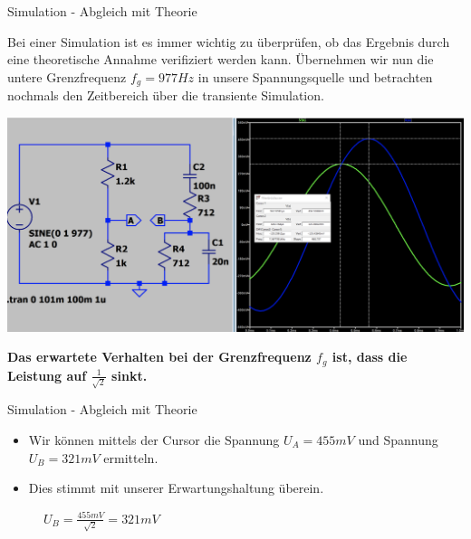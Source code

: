 \begin{frame}[t]{Simulation - Abgleich mit Theorie}

  Bei einer Simulation ist es immer wichtig zu überprüfen, ob das Ergebnis durch eine theoretische Annahme verifiziert werden kann.
  Übernehmen wir nun die untere Grenzfrequenz $f_g=977Hz$ in unsere Spannungsquelle und betrachten nochmals den Zeitbereich über die transiente Simulation.

  \begin{spacing}{0.9} \begin{tiny}
      \begin{minipage}{\textwidth}
        \includegraphics[width=0.75\linewidth]{pictures/wheatstone_transientent_fg.png}
      \end{minipage}
    \end{tiny} \end{spacing}

  \textbf{Das erwartete Verhalten bei der Grenzfrequenz $f_g$ ist, dass die Leistung auf $\frac{1}{\sqrt{2}}$ sinkt.}
\end{frame}

\begin{frame}[t]{Simulation - Abgleich mit Theorie}

  \begin{itemize}
    \item Wir können mittels der Cursor die Spannung $U_A=455mV$ und Spannung $U_B=321mV$ ermitteln.
    \item Dies stimmt mit unserer Erwartungshaltung überein.
  \end{itemize}
  \begin{figure}
    \centering
    $U_B=\frac{455mV}{\sqrt{2}}=321mV$
  \end{figure}

\end{frame}